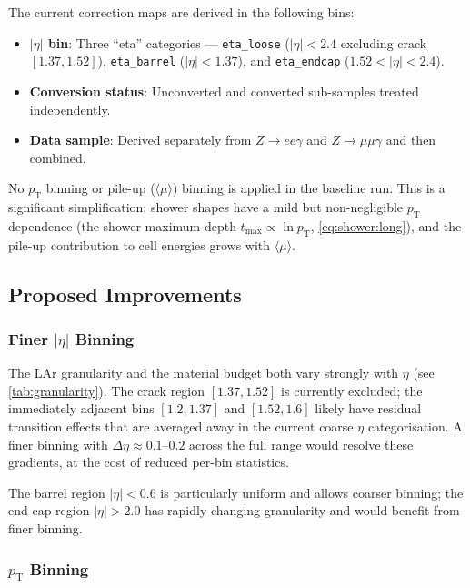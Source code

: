 \documentclass[11pt,a4paper]{article}
\newcommand{\abseta}{|\eta|}
\newcommand{\avgmu}{\langle\mu\rangle}
\begin{document}
The current correction maps are derived in the following bins:
\begin{itemize}
  \item \textbf{$|\eta|$ bin}: Three ``eta'' categories — \texttt{eta\_loose}
        ($\abseta < 2.4$ excluding crack $[1.37, 1.52]$),
        \texttt{eta\_barrel} ($\abseta < 1.37$), and
        \texttt{eta\_endcap} ($1.52 < \abseta < 2.4$).
  \item \textbf{Conversion status}: Unconverted and converted
        sub-samples treated independently.
  \item \textbf{Data sample}: Derived separately from
        $Z \to ee\gamma$ and $Z \to \mu\mu\gamma$ and then combined.
\end{itemize}

No $p_\mathrm{T}$ binning or pile-up ($\avgmu$) binning is applied in
the baseline run.  This is a significant simplification: shower shapes
have a mild but non-negligible $p_\mathrm{T}$ dependence (the shower
maximum depth $t_\mathrm{max} \propto \ln p_\mathrm{T}$,
\cref{eq:shower:long}), and the pile-up contribution to cell energies
grows with $\avgmu$.

\subsection{Proposed Improvements}
\label{sec:binning:proposed}

\subsubsection{Finer $|\eta|$ Binning}

The LAr granularity and the material budget both vary strongly with
$\eta$ (see \cref{tab:granularity}).  The crack region
$[1.37, 1.52]$ is currently excluded; the immediately adjacent bins
$[1.2, 1.37]$ and $[1.52, 1.6]$ likely have residual transition
effects that are averaged away in the current coarse $\eta$
categorisation.  A finer binning with $\Delta\eta \approx 0.1$--$0.2$
across the full range would resolve these gradients, at the cost of
reduced per-bin statistics.

The barrel region $\abseta < 0.6$ is particularly uniform and allows
coarser binning; the end-cap region $\abseta > 2.0$ has rapidly
changing granularity and would benefit from finer binning.

\subsubsection{$p_\mathrm{T}$ Binning}
\end{document}
